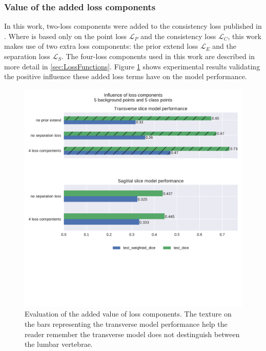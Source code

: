 \subsubsection{Value of the added loss components}
\par{
    In this work, two-loss components were added to the consistency loss published in \cite{Laradji2021}.
    Where \cite{Laradji2021} is based only on the point loss $\mathcal{L}_P$ and the consistency loss $\mathcal{L}_C$, this work makes use of two extra loss components:
    the prior extend loss $\mathcal{L}_E$ and the separation loss $\mathcal{L}_S$. The four-loss components used in this work are described in more detail in \ref{sec:LossFunctions}.
    Figure \ref{fig:addedLossComponents} shows experimental results validating the positive influence these added loss terms have on the model performance.
}
\begin{figure}
    \centering
    \includegraphics[width=.95\textwidth]{images/Losscomponents.pdf}
    \caption{Evaluation of the added value of loss components. 
    The texture on the bars representing the transverse model performance help the reader remember the transverse model does not destinguish between the lumbar vertebrae.
    \label{fig:addedLossComponents}}
\end{figure}

